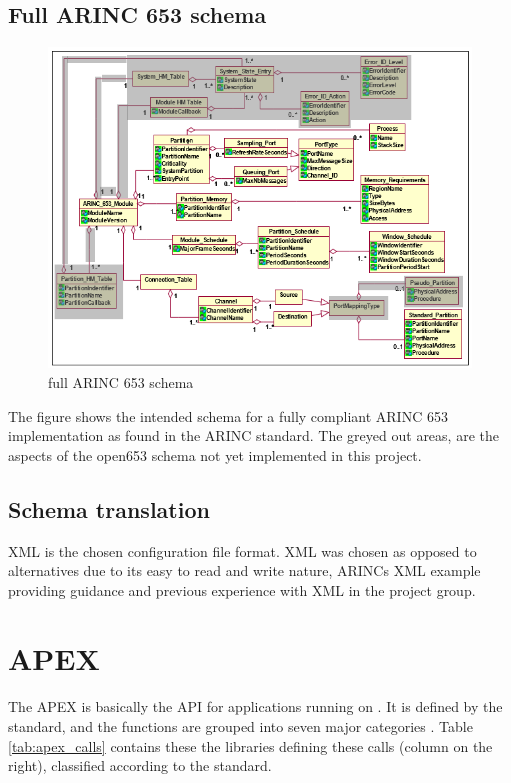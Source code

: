 \subsection{Full ARINC 653 schema}

\begin{figure}[H]
	\includegraphics{figures/originalschema.png}
	\caption{full ARINC 653 schema}
	\label{fig:arinc653schema}
\end{figure}

The figure shows the intended schema for a fully compliant ARINC 653 implementation as found in the ARINC standard.  The greyed out areas, are the aspects of the open653 schema not yet implemented in this project. 

\subsection{Schema translation}

XML is the chosen configuration file format. XML was chosen as opposed to alternatives due to its easy to read and write nature, ARINC\textquotesingle s XML example providing guidance and previous experience with XML in the project group.

\section{APEX}
The APEX is basically the API for applications running on \OSname{}.
It is defined by the standard, and the functions are grouped into 
seven major categories \cite{arinc_page_45}. Table \ref{tab:apex_calls}
contains these the libraries defining these calls (column on the right),
classified according to the standard.

